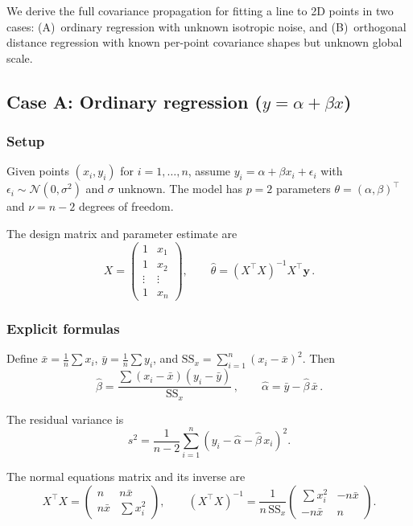 \documentclass[11pt]{article}
\newcommand{\Normal}{\mathcal{N}}
\begin{document}
We derive the full covariance propagation for fitting a line to 2D points
in two cases: (A)~ordinary regression with unknown isotropic noise, and
(B)~orthogonal distance regression with known per-point covariance shapes
but unknown global scale.

\subsection{Case A: Ordinary regression ($y = \alpha + \beta x$)}

\subsubsection{Setup}

Given points $(x_i, y_i)$ for $i = 1, \ldots, n$, assume
$y_i = \alpha + \beta x_i + \epsilon_i$ with $\epsilon_i \sim \Normal(0, \sigma^2)$
and $\sigma$ unknown. The model has $p = 2$ parameters
$\theta = (\alpha, \beta)^\top$ and $\nu = n - 2$ degrees of freedom.

The design matrix and parameter estimate are
\begin{equation}
  X = \begin{pmatrix} 1 & x_1 \\ 1 & x_2 \\ \vdots & \vdots \\ 1 & x_n \end{pmatrix},
  \qquad
  \hat\theta = (X^\top X)^{-1} X^\top \mathbf{y}\,.
\end{equation}

\subsubsection{Explicit formulas}

Define $\bar{x} = \frac{1}{n}\sum x_i$, $\bar{y} = \frac{1}{n}\sum y_i$,
and $\mathrm{SS}_x = \sum_{i=1}^n (x_i - \bar{x})^2$. Then
\begin{equation}
  \hat\beta = \frac{\sum(x_i - \bar{x})(y_i - \bar{y})}{\mathrm{SS}_x}\,,
  \qquad
  \hat\alpha = \bar{y} - \hat\beta\, \bar{x}\,.
\end{equation}

The residual variance is
\begin{equation}
  s^2 = \frac{1}{n-2} \sum_{i=1}^n (y_i - \hat\alpha - \hat\beta\, x_i)^2.
\end{equation}

The normal equations matrix and its inverse are
\begin{equation}
  X^\top X
  = \begin{pmatrix} n & n\bar{x} \\ n\bar{x} & \textstyle\sum x_i^2 \end{pmatrix},
  \qquad
  (X^\top X)^{-1}
  = \frac{1}{n\, \mathrm{SS}_x}
    \begin{pmatrix} \sum x_i^2 & -n\bar{x} \\ -n\bar{x} & n \end{pmatrix}.
\end{equation}
\end{document}
